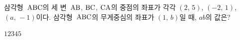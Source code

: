 삼각형~$\mathrm{ABC}$의 세 변~$\mathrm{AB}$, $\mathrm{BC}$, $\mathrm{CA}$의 중점의 좌표가 각각 $(2,\,5)$, $(-2,\,1)$, $(a,\,-1)$이다. 삼각형~$\mathrm{ABC}$의 무게중심의 좌표가 $(1,\,b)$일 때, $ab$의 값은?
\begin{choices32}{$1$}{$2$}{$3$}{$4$}{$5$}\end{choices32}
